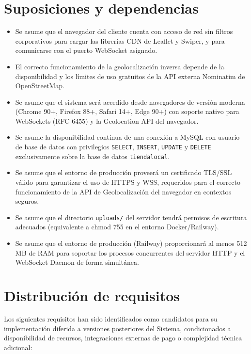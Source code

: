 \documentclass[11pt,a4paper]{report}
\begin{document}
\section{Suposiciones y dependencias}
\begin{itemize}
    \item Se asume que el navegador del cliente cuenta con acceso de red sin filtros corporativos para cargar las librerías CDN de Leaflet y Swiper, y para comunicarse con el puerto WebSocket asignado.
    \item El correcto funcionamiento de la geolocalización inversa depende de la disponibilidad y los límites de uso gratuitos de la API externa Nominatim de OpenStreetMap.
    \item Se asume que el sistema será accedido desde navegadores de versión moderna (Chrome 90+, Firefox 88+, Safari 14+, Edge 90+) con soporte nativo para WebSockets (RFC 6455) y la Geolocation API del navegador.
    \item Se asume la disponibilidad continua de una conexión a MySQL con usuario de base de datos con privilegios \texttt{SELECT}, \texttt{INSERT}, \texttt{UPDATE} y \texttt{DELETE} exclusivamente sobre la base de datos \texttt{tiendalocal}.
    \item Se asume que el entorno de producción proveerá un certificado TLS/SSL válido para garantizar el uso de HTTPS y WSS, requeridos para el correcto funcionamiento de la API de Geolocalización del navegador en contextos seguros.
    \item Se asume que el directorio \texttt{uploads/} del servidor tendrá permisos de escritura adecuados (equivalente a chmod 755 en el entorno Docker/Railway).
    \item Se asume que el entorno de producción (Railway) proporcionará al menos 512 MB de RAM para soportar los procesos concurrentes del servidor HTTP y el WebSocket Daemon de forma simultánea.
\end{itemize}

\section{Distribución de requisitos}
Los siguientes requisitos han sido identificados como candidatos para su implementación diferida a versiones posteriores del Sistema, condicionados a disponibilidad de recursos, integraciones externas de pago o complejidad técnica adicional:
\end{document}
